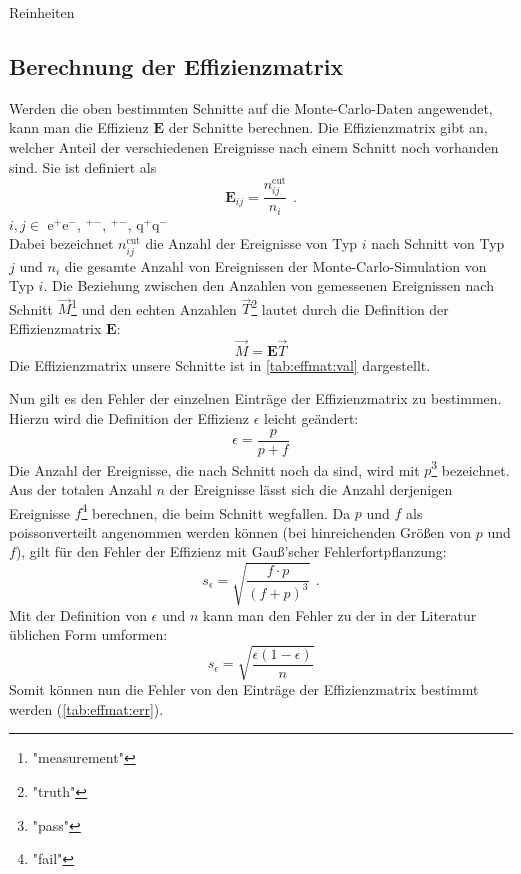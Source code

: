 Reinheiten
\subsection{Berechnung der Effizienzmatrix}
Werden die oben bestimmten Schnitte auf die Monte-Carlo-Daten angewendet, kann man die Effizienz $\bm{E}$ der Schnitte berechnen. 
Die Effizienzmatrix gibt an, welcher Anteil der verschiedenen Ereignisse nach einem Schnitt noch vorhanden sind. Sie ist definiert als 
\begin{equation}
    \bm{E}_{ij} = \frac{n_{ij}^\text{cut}}{n_i} \ \, .
\end{equation} 
$i, j \in $ e$^+$e$^-$, \textmu$^+$\textmu$^-$, \texttau$^+$\texttau$^-$, q$^+$q$^-$ \\  %
Dabei bezeichnet $n_{ij}^\text{cut}$ die Anzahl der Ereignisse von Typ $i$ nach Schnitt von Typ $j$ und $n_i$ die gesamte Anzahl von Ereignissen 
der Monte-Carlo-Simulation von Typ $i$. 
Die Beziehung zwischen den Anzahlen von gemessenen Ereignissen nach Schnitt $\vec{M}$\footnote{"measurement"} und den echten Anzahlen 
$\vec{T}$\footnote{"truth"} lautet durch die Definition der Effizienzmatrix $\bm{E}$:
\begin{equation}
    \label{eq:effmat:mtrel}
    \vec{M} = \bm{E} \vec{T}
\end{equation}
Die Effizienzmatrix unsere Schnitte ist in \autoref{tab:effmat:val} dargestellt.

Nun gilt es den Fehler der einzelnen Einträge der Effizienzmatrix zu bestimmen. Hierzu wird die Definition der Effizienz $\epsilon$ leicht geändert:
\begin{equation}
    \epsilon = \frac{p}{p+f}	
\end{equation}
Die Anzahl der Ereignisse, die nach Schnitt noch da sind, wird mit $p$\footnote{"pass"} bezeichnet. Aus der totalen Anzahl $n$ der Ereignisse lässt 
sich die Anzahl derjenigen Ereignisse $f$\footnote{"fail"} berechnen, die beim Schnitt wegfallen. Da $p$ und $f$ als poissonverteilt angenommen 
werden können (bei hinreichenden Größen von $p$ und $f$), gilt für den Fehler der Effizienz mit Gauß'scher Fehlerfortpflanzung:
\begin{equation}
    s_\epsilon = \sqrt{\frac{f \cdot p}{ \left( f + p \right)^3}} \ \, .
\end{equation}
Mit der Definition von $\epsilon$ und $n$ kann man den Fehler zu der in der Literatur üblichen Form umformen:
\begin{equation}
    s_\epsilon = \sqrt{\frac{\epsilon (1-\epsilon)}{n}}
\end{equation}
Somit können nun die Fehler von den Einträge der Effizienzmatrix bestimmt werden (\autoref{tab:effmat:err}).

